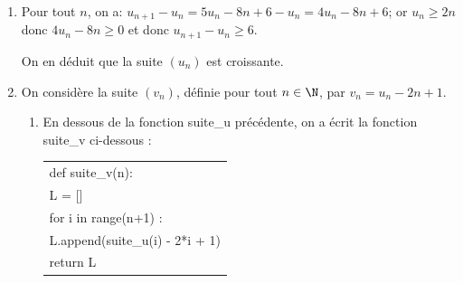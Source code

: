 \begin{enumerate}
\begin{enumerate}

On a donc démontré que, pour tout entier naturel $n$, on a: $u_n\geqslant 2n$.		
		
		\item
$\ds\lim _{n\to +\infty} 2n=+\infty$ et $u_n\geqslant 2n$ donc $\ds\lim _{n\to +\infty} u_n = +\infty$.
		
		\item Soit $p \in \N^*$.
		
$\ds\lim _{n\to +\infty} u_n = +\infty$ donc, d'après la définition de la limite vers $+\infty$ d'une suite, pour tout réel $A>0$, il existe un rang $n_0$ à partir duquel tous les termes de la suite sont supérieurs à $A$; donc il existe un rang $n_0$ tel que si $n\geqslant n_0$, alors $u_{n_0}\geqslant 10^p$.
\end{enumerate}

\item 
Pour tout $n$, on a:
$u_{n+1}-u_n=5u_n-8n+6 -u_n = 4u_n - 8n +6$;
or $u_n\geqslant 2n$ donc $4u_n-8n\geqslant 0$ et donc $u_{n+1}-u_n\geqslant 6$.

On en déduit que la suite $(u_n)$ est croissante.

\item On considère la suite $\left(v_n\right)$, définie pour tout $n \in  \N$, par $v_n = u_n - 2n + 1$.
	\begin{enumerate}
		\item En dessous de la fonction {\ttfamily suite\_u} précédente, on a écrit la fonction {\ttfamily suite\_v} ci-dessous :
\begin{center}
\begin{tabular}{>{\ttfamily}l}
def suite\_v(n):\\
\qquad L = []\\
\qquad  for i in range(n+1) :\\
\qquad \vline \qquad L.append(suite\_u(i) - 2*i + 1)\\
\qquad return L
\end{tabular}
\end{center}




\end{enumerate}
\end{enumerate}

